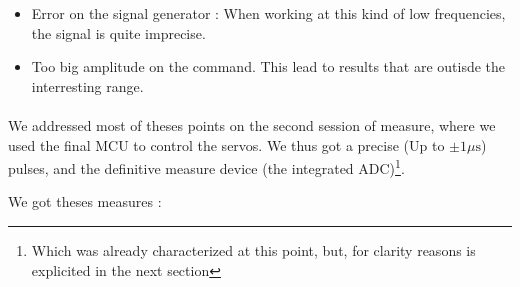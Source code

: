\begin{itemize}
    \item Error on the signal generator : When working at this kind of low frequencies, the signal is quite imprecise.
    \item Too big amplitude on the command. This lead to results that are outisde the interresting range.
\end{itemize}

\paragraph{}
We addressed most of theses points on the second session of measure, where we used the final MCU to control the servos.
We thus got a precise (Up to $\pm 1 \si{\mu\second}$) pulses, and the definitive measure device (the integrated ADC)\footnote{
    Which was already characterized at this point, but, for clarity reasons is explicited in the next section
}.

We got theses measures :

